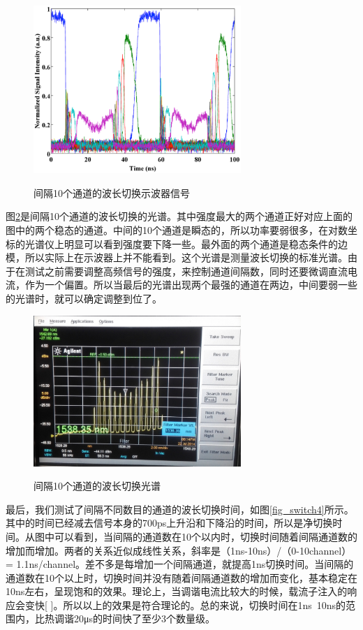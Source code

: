 \documentclass{ZJUthesis}
\begin{document}
\begin{figure}[!ht]
  \centering
  \includegraphics[width=0.7\textwidth]{./Pictures/switch2.eps}\\
  \caption{间隔10个通道的波长切换示波器信号}
  \label{fig_switch2}
\end{figure}

图\ref{fig_switch3}是间隔10个通道的波长切换的光谱。其中强度最大的两个通道正好对应上面的图中的两个稳态的通道。中间的10个通道是瞬态的，所以功率要弱很多，在对数坐标的光谱仪上明显可以看到强度要下降一些。最外面的两个通道是稳态条件的边模，所以实际上在示波器上并不能看到。这个光谱是测量波长切换的标准光谱。由于在测试之前需要调整高频信号的强度，来控制通道间隔数，同时还要微调直流电流，作为一个偏置。所以当最后的光谱出现两个最强的通道在两边，中间要弱一些的光谱时，就可以确定调整到位了。

\begin{figure}[!ht]
  \centering
  \includegraphics[width=0.7\textwidth]{./Pictures/switch3.eps}\\
  \caption{间隔10个通道的波长切换光谱}
  \label{fig_switch3}
\end{figure}

最后，我们测试了间隔不同数目的通道的波长切换时间，如图\ref{fig_switch4}所示。其中的时间已经减去信号本身的700ps上升沿和下降沿的时间，所以是净切换时间。从图中可以看到，当间隔的通道数在10个以内时，切换时间随着间隔通道数的增加而增加。两者的关系近似成线性关系，斜率是（1ns-10ns）/（0-10channel） = 1.1ns/channel。差不多是每增加一个间隔通道，就提高1ns切换时间。当间隔的通道数在10个以上时，切换时间并没有随着间隔通道数的增加而变化，基本稳定在10ns左右，呈现饱和的效果。理论上，当调谐电流比较大的时候，载流子注入的响应会变快[ ]。所以以上的效果是符合理论的。总的来说，切换时间在1ns~10ns的范围内，比热调谐20μs的时间快了至少3个数量级。
\end{document}
